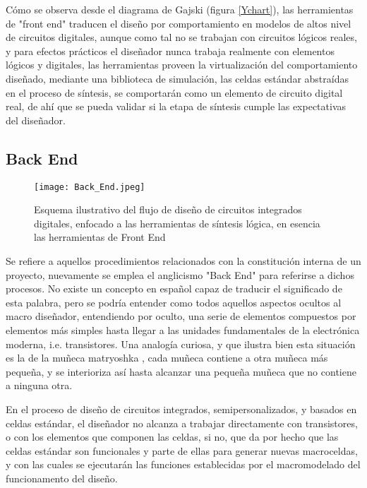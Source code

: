 {Cómo se observa desde el diagrama de Gajski (figura \ref{Ychart}), las herramientas de "front end" traducen el diseño por comportamiento en modelos de altos nivel de circuitos digitales, aunque como tal no se trabajan con circuitos lógicos reales, y para efectos prácticos el diseñador nunca trabaja realmente con elementos lógicos y digitales, las herramientas proveen la virtualización del comportamiento diseñado, mediante una biblioteca de simulación, las celdas estándar abstraídas en el proceso de síntesis, se comportarán como un elemento de circuito digital real, de ahí que se pueda validar si la etapa de síntesis cumple las expectativas del diseñador.

\newpage
\subsection{Back End}

\begin{figure}[h]
\texttt{[image: Back\_End.jpeg]}
\centering
\caption{Esquema ilustrativo del flujo de diseño de circuitos integrados digitales, enfocado a las herramientas de síntesis lógica, en esencia las herramientas de Front End}
\label{be}
\end{figure}

Se refiere a aquellos procedimientos relacionados con la constitución interna de un proyecto, nuevamente se emplea el anglicismo "Back End" para referirse a dichos procesos. No existe un concepto en español capaz de traducir el significado de esta palabra, pero se podría entender como todos aquellos aspectos ocultos al macro diseñador, entendiendo por oculto, una serie de elementos compuestos por elementos más simples hasta llegar a las unidades fundamentales de la electrónica moderna, i.e. transistores. Una analogía curiosa, y que ilustra bien esta situación es la de la muñeca matryoshka \cite{book:matryoshka}, cada muñeca contiene a otra muñeca más pequeña, y se interioriza así hasta alcanzar una pequeña muñeca que no contiene a ninguna otra.

En el proceso de diseño de circuitos integrados, semipersonalizados, y basados en celdas estándar, el diseñador no alcanza a trabajar directamente con transistores, o con los elementos que componen las celdas, si no, que da por hecho que las celdas estándar son funcionales y parte de ellas para generar nuevas macroceldas, y con las cuales se ejecutarán las funciones establecidas por el macromodelado del funcionamento del diseño.

}
